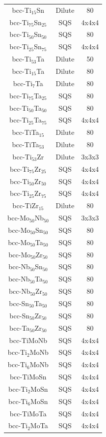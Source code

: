 \begin{longtable}[H]{ c c c }
	bcc-Ti$_{15}$Sn & Dilute & 80\\
	bcc-Ti$_{75}$Sn$_{25}$ & SQS & 4x4x4\\
	bcc-Ti$_{50}$Sn$_{50}$ & SQS & 80\\
	bcc-Ti$_{25}$Sn$_{75}$ & SQS & 4x4x4\\
	bcc-Ti$_{53}$Ta & Dilute & 50\\
	bcc-Ti$_{15}$Ta & Dilute & 80\\
	bcc-Ti$_{7}$Ta & Dilute & 80\\
	bcc-Ti$_{75}$Ta$_{25}$ & SQS & 80\\
	bcc-Ti$_{50}$Ta$_{50}$ & SQS & 80\\
	bcc-Ti$_{25}$Ta$_{75}$ & SQS & 4x4x4\\
	bcc-TiTa$_{15}$ & Dilute & 80\\
	bcc-TiTa$_{53}$ & Dilute & 80\\
	bcc-Ti$_{53}$Zr & Dilute & 3x3x3\\
	bcc-Ti$_{75}$Zr$_{25}$ & SQS & 4x4x4\\
	bcc-Ti$_{50}$Zr$_{50}$ & SQS & 4x4x4\\
	bcc-Ti$_{25}$Zr$_{75}$ & SQS & 4x4x4\\
	bcc-TiZr$_{15}$ & Dilute & 80\\
	bcc-Mo$_{50}$Nb$_{50}$ & SQS & 3x3x3\\
	bcc-Mo$_{50}$Sn$_{50}$ & SQS & 80\\
	bcc-Mo$_{50}$Ta$_{50}$ & SQS & 80\\
	bcc-Mo$_{50}$Zr$_{50}$ & SQS & 80\\
	bcc-Nb$_{50}$Sn$_{50}$ & SQS & 80\\
	bcc-Nb$_{50}$Ta$_{50}$ & SQS & 80\\
	bcc-Nb$_{50}$Zr$_{50}$ & SQS & 80\\
	bcc-Sn$_{50}$Ta$_{50}$ & SQS & 80\\
	bcc-Sn$_{50}$Zr$_{50}$ & SQS & 80\\
	bcc-Ta$_{50}$Zr$_{50}$ & SQS & 80\\
	bcc-TiMoNb & SQS & 4x4x4\\
	bcc-Ti$_{2}$MoNb & SQS & 4x4x4\\
	bcc-Ti$_{6}$MoNb & SQS & 4x4x4\\
	bcc-TiMoSn & SQS & 4x4x4\\
	bcc-Ti$_{2}$MoSn & SQS & 4x4x4\\
	bcc-Ti$_{6}$MoSn & SQS & 4x4x4\\
	bcc-TiMoTa & SQS & 4x4x4\\
	bcc-Ti$_{2}$MoTa & SQS & 4x4x4\\

\end{longtable}
